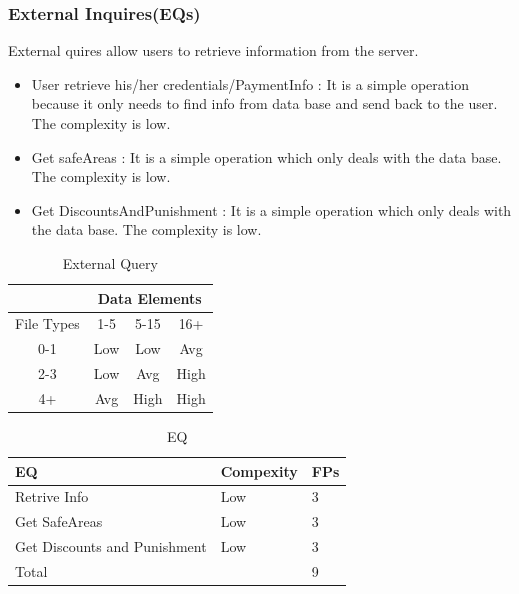 \documentclass{article}
\begin{document}
	\subsubsection{External Inquires(EQs)}
	External quires allow users to retrieve information from the server.
	\begin{itemize}
		\item User retrieve his/her credentials/PaymentInfo : It is a simple operation  because it only needs to find info from data base and send back to the user. The complexity is low.
		\item Get safeAreas : It is a simple operation which only deals with the data base. The complexity is low.
		\item Get DiscountsAndPunishment : It is a simple operation which only deals with the data base. The complexity is low.
	\end{itemize}
	\begin{table}[h]
	\centering
	\caption{External Query}
	\label{my-label}
	\begin{tabular}{|c|l|c|c|c|}
		\hline
		\multicolumn{2}{|c|}{}           & \multicolumn{3}{c|}{Data Elements} \\ \hline
		\multicolumn{2}{|c|}{File Types} & 1-5       & 5-15       & 16+       \\ \hline
		\multicolumn{2}{|c|}{0-1}        & Low       & Low        & Avg       \\ \hline
		\multicolumn{2}{|c|}{2-3}        & Low       & Avg        & High      \\ \hline
		\multicolumn{2}{|c|}{4+}         & Avg       & High       & High      \\ \hline
	\end{tabular}
\end{table}
\begin{table}[h]
	\centering
	\caption{EQ}
	\label{my-label}
	\begin{tabular}{|l|l|l|}
		\hline
		EQ                           & Compexity & FPs \\ \hline
		Retrive Info                 & Low       & 3   \\ \hline
		Get SafeAreas                & Low       & 3   \\ \hline
		Get Discounts and Punishment & Low       & 3   \\ \hline
		\multicolumn{2}{|l|}{Total}                    & 9  \\ \hline
	\end{tabular}
\end{table}
\end{document}

